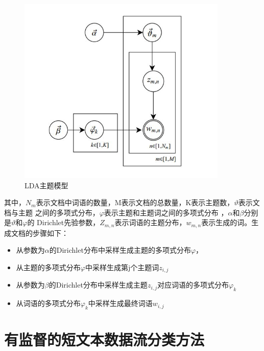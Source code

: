 \begin{figure}[H]
  \centering
  \includegraphics[width=10cm]{./figs/lda.png}
  \caption{LDA主题模型}
  \label{fig:lda}
\end{figure}

其中，$N_m$表示文档中词语的数量，M表示文档的总数量，K表示主题数，$\vartheta$表示文档与主题
之间的多项式分布，$\varphi$表示主题和主题词之间的多项式分布
，$\alpha$和$\beta$分别是$\vartheta$和$\varphi$的
Dirichlet先验参数，$Z_{m,n}$表示词语的主题分布，$w_{m,n}$表示生成的词。生成文档的步骤如下：
\begin{itemize}
\item 从参数为$\alpha$的Dirichlet分布中采样生成主题的多项式分布$\varphi$，
\item 从主题的多项式分布$\varphi$中采样生成第j个主题词$z_{i,j}$
\item 从参数为$\beta$的Dirichlet分布中采样生成主题$z_{i,j}$对应词语的多项式分布$\varphi_{k}$
\item 从词语的多项式分布$\varphi_{k}$中采样生成最终词语$w_{i,j}$
\end{itemize}

 
\section{有监督的短文本数据流分类方法}


